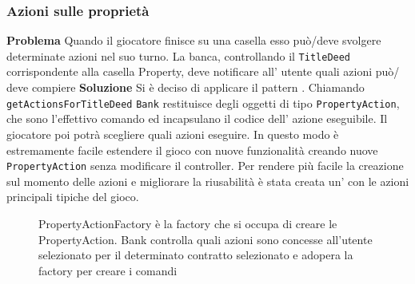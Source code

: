 \subsubsection{Azioni sulle proprietà}
\textbf{Problema}\newline
Quando il giocatore finisce su una casella 
esso può/deve svolgere determinate azioni nel suo turno. 
La banca, controllando il \texttt{TitleDeed} corrispondente alla casella Property,  
deve notificare all' utente quali azioni può/ deve compiere\newline
\textbf{Soluzione}\newline
Si è deciso di applicare il pattern .\newline
Chiamando \texttt{getActionsForTitleDeed} \texttt{Bank} 
restituisce degli oggetti di tipo \texttt{PropertyAction}, 
che sono l'effettivo comando ed incapsulano il codice dell' azione eseguibile.
Il giocatore poi potrà scegliere quali azioni eseguire.\newline 
In questo modo è estremamente facile estendere il gioco 
con nuove funzionalità creando nuove \texttt{PropertyAction} senza 
modificare il controller.\newline
Per rendere più facile la creazione sul momento delle azioni e 
migliorare la riusabilità è stata creata un’  
con le azioni principali tipiche del gioco.
\begin{figure}[H]
    \centering
    \caption{PropertyActionFactory è la factory che si occupa di creare le PropertyAction. Bank controlla quali azioni sono concesse all'utente selezionato
    per il determinato contratto selezionato e adopera la factory per creare i comandi}
	\label{img:PropertyAction}
\end{figure}